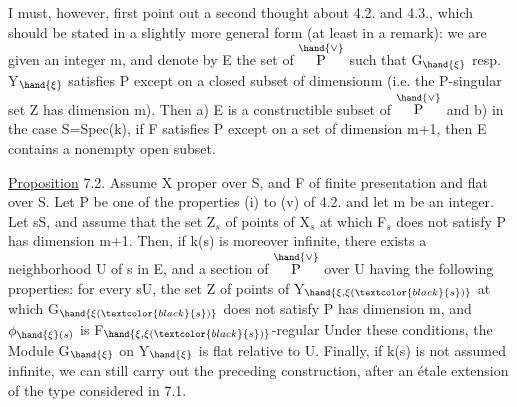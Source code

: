 
I must, however, first point out a second thought about 4.2. and 4.3., which
should be stated in a slightly more general form (at least
in a remark): we are given an integer m, and denote by E the
set of \hand{$\xi\in$}$\overset{\hand{\vee}}{\text{P}}$ such that G$_{\hand{\xi}}$ resp. Y$_{\hand{\xi}}$ satisfies P except  on a
closed subset of dimension\hand{$\leq$}m (i.e. the P-singular set Z has dimension
\hand{$\leq$} m). Then a) E is a constructible subset of $\overset{\hand{\vee}}{\text{P}}$ and b) in the
case S=Spec(k), if F  satisfies P except  on a set of
dimension\hand{$\leq$} m+1, then E contains a nonempty open subset.

\uline{Proposition} 7.2. Assume X proper over S, and F of finite
presentation and flat over S. Let P be one of the properties (i) to (v) of 4.2.
and let m be an integer. Let s\hand{$\in$}S, and assume that 
 the set Z$_s$ of points of X$_s$ at which F$_s$ does not satisfy
P has dimension \hand{$\leq$} m+1. Then, if k(s) is moreover infinite, there
exists a neighborhood U of s in E, and a section \hand{$\xi$} of $\overset{\hand{\vee}}{\text{P}}$ over U having
the following properties: for every s\hand{$\in$}U, the set Z of points
of  Y$_{\hand{\xi,\xi(\textcolor{black}{s})}}$ at which G$_{\hand{\xi(\textcolor{black}{s})}}$ does not satisfy P has dimension
\hand{$\leq$}m, and $\phi_{\hand{\xi}(s)}$ is F$_{\hand{\xi,\xi(\textcolor{black}{s})}}$-regular\hand{,}  Under these
conditions, the Module G$_{\hand{\xi}}$ on Y$_{\hand{\xi}}$ is flat relative to U. Finally, if k(s)
is not assumed infinite, we can still carry out the preceding
construction, after an étale extension of the type considered in 7.1.

